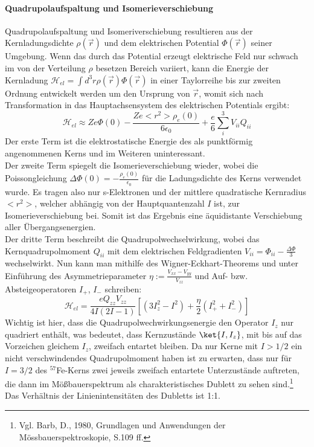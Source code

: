 \documentclass[german,  %
parskip=full,  %
headsepline]{scrartcl}
\begin{document}
\paragraph{Quadrupolaufspaltung und Isomerieverschiebung}
\label{quad}
Quadrupolaufspaltung und Isomeriverschiebung resultieren aus der Kernladungsdichte $\rho(\Vec{r})$ und dem elektrischen Potential $\Phi(\Vec{r})$ seiner Umgebung. Wenn das durch das Potential erzeugt elektrische Feld nur schwach im von der Verteilung $\rho$ besetzen Bereich variiert, kann die Energie der Kernladung $\mathcal{H}_{el}=\int d^3r\rho(\Vec{r})\Phi(\Vec{r})$ in einer Taylorreihe bis zur zweiten Ordnung entwickelt werden um den Ursprung von $\Vec{r}$, womit sich nach Transformation in das Hauptachsensystem des elektrischen Potentials ergibt: 
\begin{equation}
    \mathcal{H}_{el} \approx Ze\Phi(0) - \frac{Ze<r^2>\rho_e(0)}{6\epsilon_0} + \frac{e}{6}\sum_i^3 V_{ii}Q_{ii}
\end{equation}
Der erste Term ist die elektrostatische Energie des als punktförmig angenommenen Kerns und im Weiteren uninteressant.\\ Der zweite Term spiegelt die Isomerieverschiebung wieder, wobei die Poissongleichung $\Delta \Phi(0)=-\frac{\rho_e(0)}{\epsilon_0}$ für die Ladungsdichte des Kerns verwendet wurde. Es tragen also nur s-Elektronen und der mittlere quadratische Kernradius $<r^2>$, welcher abhängig von der Hauptquantenzahl $I$ ist, zur Isomerieverschiebung bei. Somit ist das Ergebnis eine äquidistante Verschiebung aller Übergangsenergien.\\ Der dritte Term beschreibt die Quadrupolwechselwirkung, wobei das Kernquadrupolmoment $Q_{ii}$ mit dem elektrischen Feldgradienten $V_{ii} = \Phi_{ii}-\frac{\Delta \Phi}{3}$ wechselwirkt. Nun kann man mithilfe des Wigner-Eckhart-Theorems und unter Einführung des  Asymmetrieparameter $\eta:= \frac{V_{xx}-V_{yy}}{V_{zz}}$ und Auf- bzw. Absteigeoperatoren $I_+$, $I_-$ schreiben:
\begin{equation}
    \mathcal{H}_{el} = \frac{eQ_{zz}V_{zz}}{4I(2I-1)}\left [ (3I_z^2-I^2)+\frac{\eta}{2}(I_+^2+I_-^2)\right]
\end{equation}
Wichtig ist hier, dass die Quadrupolwechwirkungsenergie den Operator $I_z$ nur quadriert enthält, was bedeutet, dass Kernzustände $\ket{I,I_z}$, mit bis auf das Vorzeichen gleichem $I_z$, zweifach entartet bleiben. Da nur Kerne mit $I>1/2$ ein nicht verschwindendes Quadrupolmoment haben ist zu erwarten, dass nur für $I=3/2$ des $^{57}$Fe-Kerns zwei jeweils zweifach entartete Unterzustände auftreten, die dann im Mößbauerspektrum als charakteristisches Dublett zu sehen sind.\footnote{Vgl. Barb, D., 1980, Grundlagen und Anwendungen der Mössbauerspektroskopie, S.109 ff.}\\
Das Verhältnis der Linienintensitäten des Dubletts ist 1:1.
\end{document}

